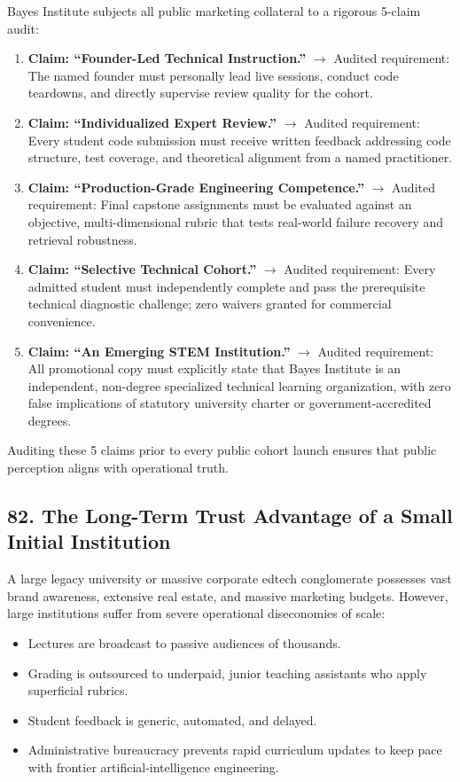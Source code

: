 Bayes Institute subjects all public marketing collateral to a rigorous 5-claim audit:
\begin{enumerate}
\item \textbf{Claim: ``Founder-Led Technical Instruction.''} $\rightarrow$ Audited requirement: The named founder must personally lead live sessions, conduct code teardowns, and directly supervise review quality for the cohort.
\item \textbf{Claim: ``Individualized Expert Review.''} $\rightarrow$ Audited requirement: Every student code submission must receive written feedback addressing code structure, test coverage, and theoretical alignment from a named practitioner.
\item \textbf{Claim: ``Production-Grade Engineering Competence.''} $\rightarrow$ Audited requirement: Final capstone assignments must be evaluated against an objective, multi-dimensional rubric that tests real-world failure recovery and retrieval robustness.
\item \textbf{Claim: ``Selective Technical Cohort.''} $\rightarrow$ Audited requirement: Every admitted student must independently complete and pass the prerequisite technical diagnostic challenge; zero waivers granted for commercial convenience.
\item \textbf{Claim: ``An Emerging STEM Institution.''} $\rightarrow$ Audited requirement: All promotional copy must explicitly state that Bayes Institute is an independent, non-degree specialized technical learning organization, with zero false implications of statutory university charter or government-accredited degrees.
\end{enumerate}

Auditing these 5 claims prior to every public cohort launch ensures that public perception aligns with operational truth.

\subsection*{82. The Long-Term Trust Advantage of a Small Initial Institution}

A large legacy university or massive corporate edtech conglomerate possesses vast brand awareness, extensive real estate, and massive marketing budgets. However, large institutions suffer from severe operational diseconomies of scale:
\begin{itemize}
\item Lectures are broadcast to passive audiences of thousands.
\item Grading is outsourced to underpaid, junior teaching assistants who apply superficial rubrics.
\item Student feedback is generic, automated, and delayed.
\item Administrative bureaucracy prevents rapid curriculum updates to keep pace with frontier artificial-intelligence engineering.
\end{itemize}

